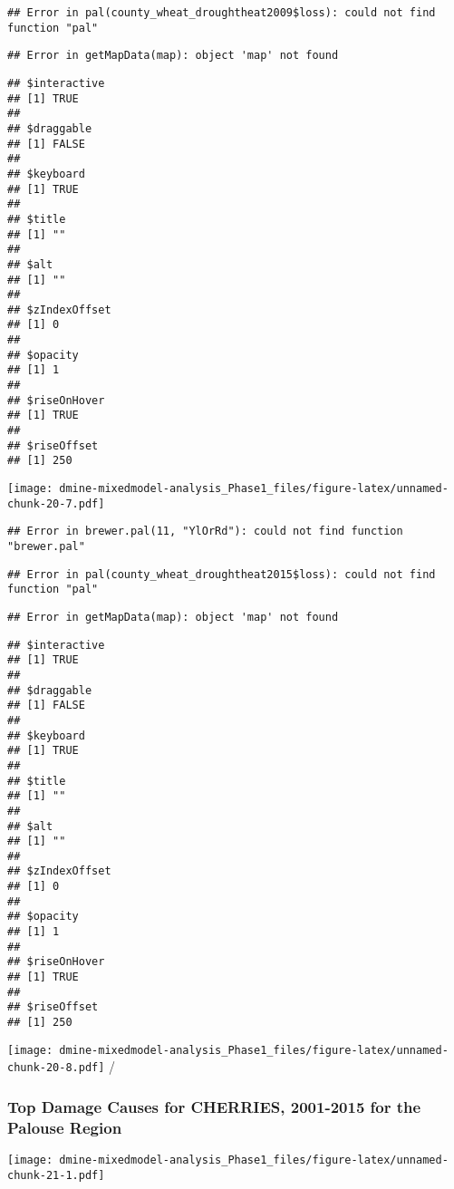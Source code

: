 \documentclass[]{article}
\begin{document}
\begin{verbatim}
## Error in pal(county_wheat_droughtheat2009$loss): could not find function "pal"
\end{verbatim}

\begin{verbatim}
## Error in getMapData(map): object 'map' not found
\end{verbatim}

\begin{verbatim}
## $interactive
## [1] TRUE
## 
## $draggable
## [1] FALSE
## 
## $keyboard
## [1] TRUE
## 
## $title
## [1] ""
## 
## $alt
## [1] ""
## 
## $zIndexOffset
## [1] 0
## 
## $opacity
## [1] 1
## 
## $riseOnHover
## [1] TRUE
## 
## $riseOffset
## [1] 250
\end{verbatim}

\texttt{[image: dmine-mixedmodel-analysis\_Phase1\_files/figure-latex/unnamed-chunk-20-7.pdf]}

\begin{verbatim}
## Error in brewer.pal(11, "YlOrRd"): could not find function "brewer.pal"
\end{verbatim}

\begin{verbatim}
## Error in pal(county_wheat_droughtheat2015$loss): could not find function "pal"
\end{verbatim}

\begin{verbatim}
## Error in getMapData(map): object 'map' not found
\end{verbatim}

\begin{verbatim}
## $interactive
## [1] TRUE
## 
## $draggable
## [1] FALSE
## 
## $keyboard
## [1] TRUE
## 
## $title
## [1] ""
## 
## $alt
## [1] ""
## 
## $zIndexOffset
## [1] 0
## 
## $opacity
## [1] 1
## 
## $riseOnHover
## [1] TRUE
## 
## $riseOffset
## [1] 250
\end{verbatim}

\texttt{[image: dmine-mixedmodel-analysis\_Phase1\_files/figure-latex/unnamed-chunk-20-8.pdf]}
/

\subsubsection{Top Damage Causes for CHERRIES, 2001-2015 for the Palouse
Region}\label{top-damage-causes-for-cherries-2001-2015-for-the-palouse-region}

\texttt{[image: dmine-mixedmodel-analysis\_Phase1\_files/figure-latex/unnamed-chunk-21-1.pdf]}
\end{document}
